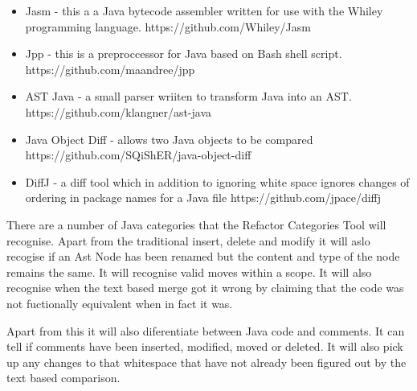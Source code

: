 % 
% 

\begin{itemize}
  \item Jasm - this a a Java bytecode assembler written for use with the Whiley programming language. https://github.com/Whiley/Jasm
  \item Jpp - this is a preproccessor for Java based on Bash shell script. https://github.com/maandree/jpp
  \item AST Java - a small parser wriiten to transform Java into an AST. https://github.com/klangner/ast-java
  \item Java Object Diff - allows two Java objects to be compared https://github.com/SQiShER/java-object-diff
  \item DiffJ - a diff tool which in addition to ignoring white space ignores changes of ordering in package names for a Java file https://github.com/jpace/diffj
\end{itemize}


There are a number of Java categories that the Refactor Categories Tool will recognise.  Apart from the traditional insert, delete and modify it will aslo recogise if an Ast Node has been renamed but the content and type of the node remains the same.  It will recognise valid moves within a scope. It will also recognise when the text based merge got it wrong by claiming that the code was not fuctionally equivalent when in fact it was.

Apart from this it will also diferentiate between Java code and comments.  It can tell if comments have been inserted, modified, moved or deleted.  It will also pick up any changes to that whitespace that have not already been figured out by the text based comparison.  

 
% 


